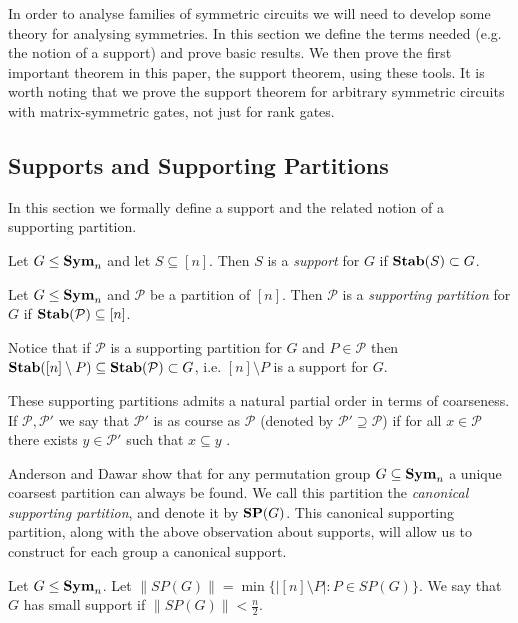 \documentclass[../paper.tex]{subfiles}
\begin{document}
In order to analyse families of symmetric circuits we will need to develop some
theory for analysing symmetries. In this section we define the terms needed
(e.g. the notion of a support) and prove basic results. We then prove the first
important theorem in this paper, the support theorem, using these tools. It is
worth noting that we prove the support theorem for arbitrary symmetric circuits
with matrix-symmetric gates, not just for rank gates.

\subsection{Supports and Supporting Partitions}
In this section we formally define a support and the related notion of a
supporting partition.

\begin{definition}
  Let $G \leq \text{\textbf{Sym}}_n$ and let $S \subseteq [n]$. Then $S$ is a
  \emph{support} for $G$ if $\text{\textbf{Stab}}(S) \subset G$.
\end{definition}

\begin{definition}
  Let $G \leq \text{\textbf{Sym}}_n$ and $\mathcal{P}$ be a partition of $[n]$.
  Then $\mathcal{P}$ is a \emph{supporting partition} for $G$ if
  $\text{\textbf{Stab}}(\mathcal{P}) \subseteq [n]$.
\end{definition}

Notice that if $\mathcal{P}$ is a supporting partition for $G$ and $P \in
\mathcal{P}$ then $\text{\textbf{Stab}}([n] \setminus P) \subseteq \text{\textbf{Stab}}(\mathcal{P}) \subset
G$, i.e. $[n] \setminus P$ is a support for $G$.

These supporting partitions admits a natural partial order in terms of
coarseness. If $\mathcal{P}, \mathcal{P}'$ we say that $\mathcal{P}'$ is as
course as $\mathcal{P}$ (denoted by $\mathcal{P}' \supseteq \mathcal{P}$) if for
all $x \in \mathcal{P}$ there exists $y \in \mathcal{P}'$ such that $x \subseteq
y$ \cite{AndersonD17}.

Anderson and Dawar \cite{AndersonD17} show that for any permutation group $G
\subseteq \text{\textbf{Sym}}_n$ a unique coarsest partition can always be found. We call this
partition the \emph{canonical supporting partition}, and denote it by $\text{\textbf{SP}} (G)$.
This canonical supporting partition, along with the above observation about
supports, will allow us to construct for each group a canonical support.

\begin{definition}
  Let $G \leq \text{\textbf{Sym}}_n$. Let $\| SP(G) \| = \min \{\vert [n]
  \setminus P \vert : P \in SP(G) \}$. We say that $G$ has small support if $\|
  SP(G) \| < \frac{n}{2}$.
\end{definition}
\end{document}
